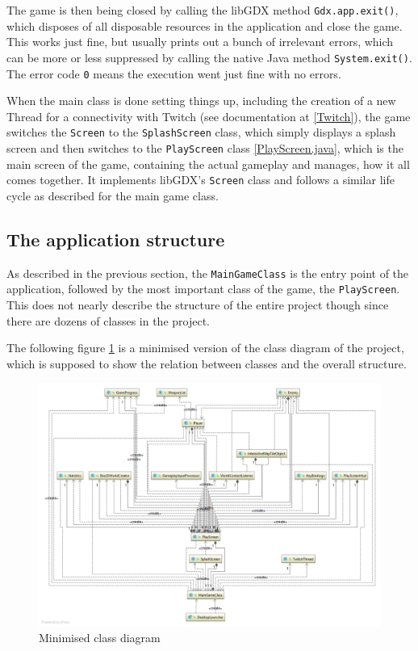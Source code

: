 \documentclass[12p]{article}
\begin{document}
The game is then being closed by calling the libGDX method \texttt{Gdx.app.exit()}, which disposes of all disposable resources in the application and close the game. This works just fine, but usually prints out a bunch of irrelevant errors, which can be more or less suppressed by calling the native Java method \texttt{System.exit()}. The error code \texttt{0} means the execution went just fine with no errors.

When the main class is done setting things up, including the creation of a new Thread for a connectivity with Twitch (see documentation at \ref{Twitch}), the game switches the \texttt{Screen} to the \texttt{SplashScreen} class, which simply displays a splash screen and then switches to the \texttt{PlayScreen} class \ref{PlayScreen.java}, which is the main screen of the game, containing the actual gameplay and manages, how it all comes together. It implements libGDX's \texttt{Screen} class and follows a similar life cycle as described for the main game class.


\subsection{The application structure} \label{DocApplicationStructure}

As described in the previous section, the \texttt{MainGameClass} is the entry point of the application, followed by the most important class of the game, the \texttt{PlayScreen}. This does not nearly describe the structure of the entire project though since there are dozens of classes in the project.

The following figure \ref{fig:minClassDiagram} is a minimised version of the class diagram of the project, which is supposed to show the relation between classes and the overall structure.

\begin{figure}[ht]
  \centering
  \includegraphics[width=1\textwidth]{Documentation/class_diagram_minimized.png}
  \caption{Minimised class diagram}
  \label{fig:minClassDiagram}
\end{figure}
\end{document}
